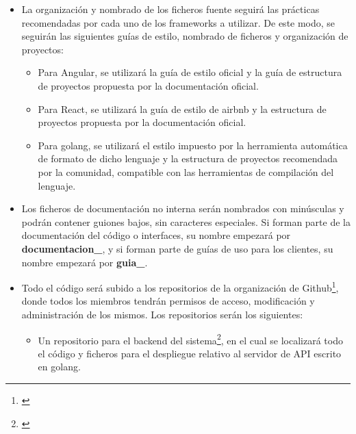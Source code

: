 \documentclass[11pt, a4paper, titlepage]{article}
\begin{document}
\begin{itemize}
    \item La organización y nombrado de los ficheros fuente seguirá las prácticas recomendadas por cada uno de los frameworks a utilizar. De este modo, se seguirán las siguientes guías de estilo, nombrado de ficheros y organización de proyectos:
    \begin{itemize}
        \item Para Angular, se utilizará la guía de estilo oficial\textsuperscript{\cite{estiloangular}} y la guía de estructura de proyectos propuesta por la documentación oficial\textsuperscript{\cite{estructuraangular}}.
        
        \item Para React, se utilizará la
        guía de estilo de airbnb\textsuperscript{\cite{estiloreact}} y la estructura de proyectos propuesta por la documentación oficial\textsuperscript{\cite{estructurareact}}.
        
        \item Para golang, se utilizará el estilo impuesto por la herramienta automática de formato de dicho lenguaje\textsuperscript{\cite{estilogolang}} y la estructura de proyectos recomendada por la comunidad\textsuperscript{\cite{estructuragolang}}, compatible con las herramientas de compilación del lenguaje.
    \end{itemize}
    
    \item Los ficheros de documentación no interna serán nombrados con minúsculas y podrán contener guiones bajos, sin caracteres especiales. Si forman parte de la documentación del código o interfaces, su nombre empezará por \textbf{documentacion\_}, y si forman parte de guías de uso para los clientes, su nombre empezará por \textbf{guia\_}.
    
    \item Todo el código será subido a los repositorios de la organización de Github\footnote{\href{https://github.com/UNIZAR-30226-2022-01}{\color{blue}{Repositorio de la organización de Github}}}, donde todos los miembros tendrán permisos de acceso, modificación y administración de los mismos. Los repositorios serán los siguientes:
    \begin{itemize}
        \item Un repositorio para el backend del sistema\footnote{\href{https://github.com/UNIZAR-30226-2022-01/proyecto_software_backend}{\color{blue}{Repositorio del backend del sistema}}}, en el cual se localizará todo el código y ficheros para el despliegue relativo al servidor de API escrito en golang.
        

\end{itemize}
\end{itemize}
\end{document}

